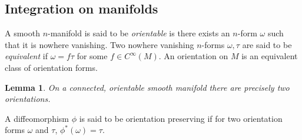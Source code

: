 \documentclass{article}
\theoremstyle{plain}
\newtheorem{lem}[teo]{Lemma}
\theoremstyle{definition}
\numberwithin{equation}{section}
\begin{document}
\subsection{Integration on manifolds}
A smooth $n$-manifold is said to be \textit{orientable} is there exists an $n$-form $\omega$ such that it is nowhere vanishing. Two nowhere vanishing $n$-forms $\omega,\tau$ are said to be \textit{equivalent} if $\omega=f\tau$ for some $f\in C^\infty(M)$. An orientation on $M$ is an equivalent class of orientation forms.
\begin{lem}
On a connected, orientable smooth manifold there are precisely two orientations.
\end{lem}
A diffeomorphism $\phi$ is said to be orientation preserving if for two orientation forms $\omega$ and $\tau$, $\phi^*(\omega)=\tau$. 
\end{document}
